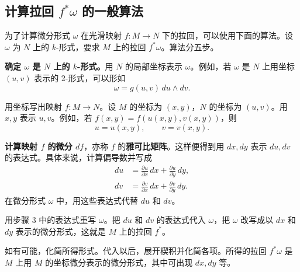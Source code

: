 \subsection{\texorpdfstring{计算拉回 $f^*\omega$ 的一般算法}{计算拉回 f*ω 的一般算法}}
为了计算微分形式 $\omega$ 在光滑映射 $f\colon M\to N$ 下的拉回，可以使用下面的算法。设 $\omega$ 为 $N$ 上的 $k$-形式，要求 $M$ 上的拉回 $f^*\omega$。算法分五步。

\textbf{确定 $\omega$ 是 $N$ 上的 $k$-形式。}用 $N$ 的局部坐标表示 $\omega$。例如，若 $\omega$ 是 $N$ 上用坐标 $(u,v)$ 表示的 2-形式，可以形如
\[
  \omega=g(u,v)\,du\wedge dv.
\]

用坐标写出映射 $f\colon M\to N$。设 $M$ 的坐标为 $(x,y)$，$N$ 的坐标为 $(u,v)$。用 $x,y$ 表示 $u,v$。例如，若 $f(x,y)=f(u(x,y),v(x,y))$，则
\[
  u=u(x,y),\qquad v=v(x,y).
\]

\textbf{计算映射 $f$ 的微分 $df$}，亦称 $f$ 的\textbf{雅可比矩阵}。这样便得到用 $dx,dy$ 表示 $du,dv$ 的表达式。具体来说，计算偏导数并写成
\[
  \begin{aligned}
    du&=\frac{\partial u}{\partial x}\,dx+\frac{\partial u}{\partial y}\,dy,\\
    dv&=\frac{\partial v}{\partial x}\,dx+\frac{\partial v}{\partial y}\,dy.
  \end{aligned}
\]
在微分形式 $\omega$ 中，用这些表达式代替 $du$ 和 $dv$。

用步骤 3 中的表达式重写 $\omega$。把 $du$ 和 $dv$ 的表达式代入 $\omega$，把 $\omega$ 改写成以 $dx$ 和 $dy$ 表示的微分形式，这就是 $M$ 上的拉回 $f^*$。

如有可能，化简所得形式。代入以后，展开楔积并化简各项。所得的拉回 $f^*\omega$ 是 $M$ 上用 $M$ 的坐标微分表示的微分形式，其中可出现 $dx,dy$ 等。

